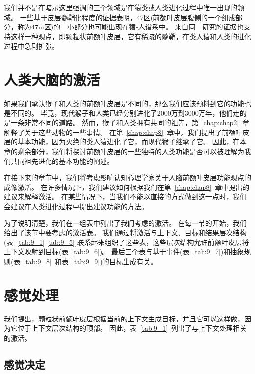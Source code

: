 我们并不是在暗示这里强调的三个领域是在猿类或人类进化过程中唯一出现的领域。
一些基于皮层髓鞘化程度的证据表明，47区(前额叶皮层腹侧的一个组成部分，称为47m区)的一小部分也可能出现在猿-人谱系中\cite{glasser2011comparative}。
来自同一研究的证据也支持这样一种观点，即颗粒状前额叶皮层，它有稀疏的髓鞘，在类人猿和人类的进化过程中急剧扩张。



\section{人类大脑的激活}

如果我们承认猴子和人类的前额叶皮层是不同的，那么我们应该预料到它的功能也是不同的。
毕竟，现代猴子和人类已经分别进化了2000万到3000万年，他们走的是一条非常不同的道路。
然而，猴子和人类拥有共同的祖先，第~\ref{chap:chap2}~章解释了关于这些动物的一些事情。
在第~\ref{chap:chap8}~章中，我们提出了前额叶皮层的基本功能，因为灭绝的类人猿进化了它，而现代猴子继承了它。
因此，在本章的剩余部分，我们将探讨前额叶皮层的一些独特的人类功能是否可以被理解为我们共同祖先进化的基本功能的阐述。
\par


在接下来的章节中，我们将考虑影响认知心理学家关于人脑前额叶皮层功能观点的成像激活。
在许多情况下，我们建议如何根据我们在第~\ref{chap:chap8}~章中提出的建议来解释激活。
在某些情况下，当我们不能以直接的方式做到这一点时，我们会建议在人类进化过程中提出建议功能的方法。
\par


为了说明清楚，我们在一组表中列出了我们考虑的激活。
在每一节的开始，我们给出了该节中要考虑的激活表。
我们通过将激活与上下文、目标和结果层次结构(表~\ref{tab:9_1}-\ref{tab:9_5})联系起来组织了这些表，这些层次结构允许前额叶皮层将上下文映射到目标(表~\ref{tab:9_6})。
最后三个表与基于事件(表~\ref{tab:9_7})和抽象规则(表~\ref{tab:9_8}~和表~\ref{tab:9_9})的目标生成有关。



\section{感觉处理}

我们提出，颗粒状前额叶皮层根据当前的上下文生成目标，并且它可以这样做，因为它位于上下文层次结构的顶部。
因此，表~\ref{tab:9_1}~列出了与上下文处理相关的激活。



\subsection{感觉决定}
\par

